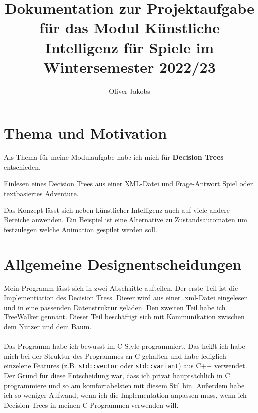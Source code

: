 \documentclass[a4paper,12pt]{article}
\title{Dokumentation zur Projektaufgabe für das Modul Künstliche Intelligenz für Spiele im Wintersemester 2022/23}
\author{Oliver Jakobs}
\begin{document}
\maketitle

\section*{Thema und Motivation}

Als Thema für meine Modulaufgabe habe ich mich für \textbf{Decision Trees} entschieden. 

Einlesen eines Decision Trees aus einer XML-Datei und Frage-Antwort Spiel oder textbasiertes Adventure.

Das Konzept lässt sich neben künstlicher Intelligenz auch auf viele andere Bereiche anwenden. Ein Beispiel ist eine Alternative zu Zustandsautomaten um festzulegen welche Animation gespilet werden soll.

\newpage

\section*{Allgemeine Designentscheidungen}

Mein Programm lässt sich in zwei Abschnitte aufteilen. Der erste Teil ist die Implementiation des Decision Tress. Dieser wird aus einer .xml-Datei eingelesen und in eine passenden Datenstruktur geladen. 
Den zweiten Teil habe ich TreeWalker gennant. Dieser Teil beschäftigt sich mit Kommunikation zwischen dem Nutzer und dem Baum. 
\\
\\
Das Programm habe ich bewusst im C-Style programmiert. Das heißt ich habe mich bei der Struktur des Programmes an C gehalten und habe lediglich einzelene Features (z.B. \texttt{std::vector} oder \texttt{std::variant}) aus C++ verwendet.
Der Grund für diese Entscheidung war, dass ich privat hauptsächlich in C programmiere und so am komfortabelsten mit diesem Stil bin. Außerdem habe ich so weniger Aufwand, wenn ich die Implementation anpassen muss, wenn ich Decision Trees in meinen C-Programmen verwenden will.
\\
\\
\end{document}
